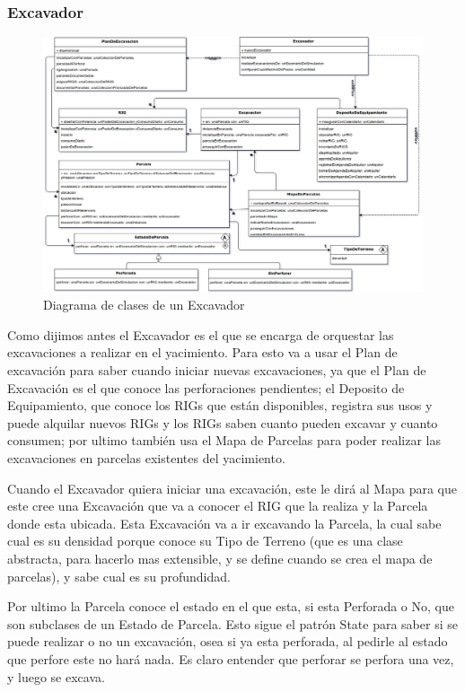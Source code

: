 \documentclass[10pt,a4paper]{article}
\begin{document}
\subsubsection{Excavador}

\begin{figure}[H]
\centerline{\includegraphics[scale=0.45]{images/DiagramaDeClases_deExcavador.png}}
\caption{Diagrama de clases de un Excavador}
\end{figure}

Como dijimos antes el Excavador es el que se encarga de orquestar las excavaciones a realizar en el yacimiento. Para esto va a usar el Plan de excavación para saber cuando iniciar nuevas excavaciones, ya que el Plan de Excavación es el que conoce las perforaciones pendientes; el Deposito de Equipamiento, que conoce los RIGs que están disponibles, registra sus usos y puede alquilar nuevos RIGs y los RIGs saben cuanto pueden excavar y cuanto consumen; por ultimo también usa el Mapa de Parcelas para poder realizar las excavaciones en parcelas existentes del yacimiento.

Cuando el Excavador quiera iniciar una excavación, este le dirá al Mapa para que este cree una Excavación que va a conocer el RIG que la realiza y la Parcela donde esta ubicada. Esta Excavación va a ir excavando la Parcela, la cual sabe cual es su densidad porque conoce su Tipo de Terreno (que es una clase abstracta, para hacerlo mas extensible, y se define cuando se crea el mapa de parcelas), y sabe cual es su profundidad.

Por ultimo la Parcela conoce el estado en el que esta, si esta Perforada o No, que son subclases de un Estado de Parcela. Esto sigue el patrón State para saber si se puede realizar o no un excavación, osea si ya esta perforada, al pedirle al estado que perfore este no hará nada. Es claro entender que perforar se perfora una vez, y luego se excava.
\end{document}
